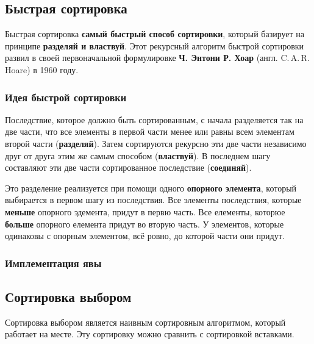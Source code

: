 \documentclass[11pt, a4paper, titlepage, twoside]{article}
\renewcommand{\emph}{\textbf}
\begin{document}
	
	
	\subsection{Быстрая сортировка}
	
	Быстрая сортировка \emph{самый быстрый способ сортировки}, который базирует на принципе \emph{разделяй и властвуй}. Этот рекурсный алгоритм быстрой сортировки развил в своей первоначальной формулировке \emph{Ч. Энтони Р. Хоар} (англ. C.\,{}A.\,{}R. Hoare) в 1960 году.
	
	\subsubsection{Идея быстрой сортировки}
	
	Последствие, которое должно быть сортированным, с начала разделяется так на две части, что все элементы в первой части менее или равны всем элементам второй части (\emph{разделяй}). Затем сортируются рекурсно эти две части независимо друг от друга этим же самым способом (\emph{властвуй}). В последнем шагу составляют эти две части сортированное последствие (\emph{соединяй}).
	
	Это разделение реализуется при помощи одного \emph{опорного элемента}, который выбирается в первом шагу из последствия. Все элементы последствия, которые \emph{меньше} опорного эдемента, придут в первю часть. Все елементы, которюе \emph{больше} опорного елемента придут во вторую часть. У элементов, которые одинаковы с опорным элементом, всё ровно, до которой части они придут.
	
	\subsubsection{Имплементация явы}
	
	
	
	\subsection{Сортировка выбором}
	
	Сортировка выбором является наивным сортировным алгоритмом, который работает на месте. Эту сортировку можно сравнить с сортировкой вставками.
	
\end{document}
